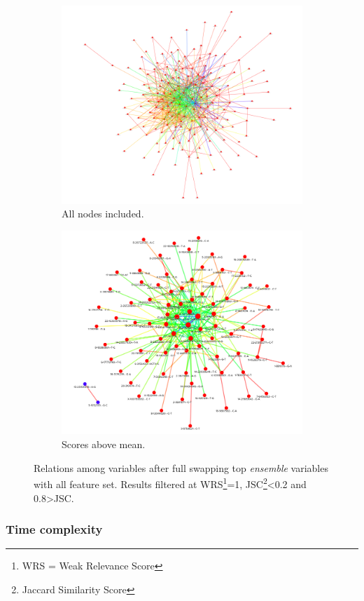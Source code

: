 \begin{figure}[!hp]
	\centering
	\captionsetup{justification=centering}
	\begin{subfigure}[b]{0.45\linewidth}
		\includegraphics[width=\linewidth]{Minor Thesis/figures/graphs/dt2_ssc0.2_0.8ssc.png}
		\caption{All nodes included.}
	\end{subfigure}
	\hfill
	\begin{subfigure}[b]{0.45\linewidth}
		\includegraphics[width=\linewidth]{Minor Thesis/figures/graphs/dt2_ssc0.2_0.8ssc_mean.png}
		\caption{Scores above mean.}
	\end{subfigure}
	\caption{Relations among variables after full swapping top \emph{ensemble} variables with all feature set. Results filtered at WRS\footnote{WRS = Weak Relevance Score}=1, JSC\footnote{Jaccard Similarity Score}<0.2 and 0.8>JSC.}
    \label{fig:dt2-trimmed}
\end{figure}

\subsubsection{Time complexity}